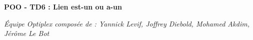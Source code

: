 \documentclass[11pt,a4paper]{article}
\begin{document}
\begin{center}
\huge{\textbf{POO - TD6 : Lien \og est-un \fg ou \og a-un \fg}}
\end{center}

\begin{flushleft}
\emph{\'Equipe \og Optiplex \fg composée de : Yannick Levif, Joffrey Diebold, Mohamed Akdim, Jérôme Le Bot}
\end{flushleft}



\end{document}
